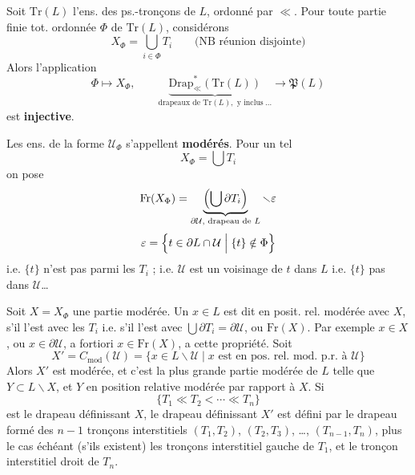 \documentclass[11pt,a4paper]{article}
\begin{document}
Soit $\mathrm{Tr}(L)$ l'ens.  des ps.-tronçons de $L$, ordonné par $\ll$. Pour toute partie finie tot. ordonnée $\Phi$ de $\mathrm{Tr}(L)$, considérons
\[
  X_{\Phi} = \bigcup_{i \in \Phi} T_i \qquad \text{(NB réunion disjointe)}
\]
Alors l'application
\[
  \Phi \longmapsto X_{\Phi}, \qquad \underbrace{\mathrm{Drap}^{*}_{\ll}(\mathrm{Tr}(L))}_{\text{drapeaux de } \mathrm{Tr}(L), \text{ y inclus}\ \ldots} \longrightarrow \mathfrak{P}(L)
\]
est \textbf{injective}.

Les ens. de la forme $\mathcal{U}_{\Phi}$ s'appellent \textbf{modérés}. Pour un tel
\[
  X_{\Phi} = \bigcup T_i
\]
on pose
\[
  \mathrm{Fr}(X_{\Phi}) = \underbrace{\Bigl( \bigcup \partial T_i \Bigr)}_{\partial \mathcal{U}, \text{ drapeau de } L} \smallsetminus \varepsilon
\]
\[
  \varepsilon = \Bigl\{ t \in \partial L \cap \mathcal{U} \;\Big|\; \{t\} \notin \Phi \Bigr\}
\]
i.e. $\{t\}$ n'est pas parmi les $T_i$ ; i.e. $\mathcal{U}$ est un voisinage de $t$ dans $L$ i.e. $\{t\}$ pas  dans $\mathcal{U}$…

 Soit $X = X_{\Phi}$ une partie modérée. Un $x \in L$ est dit en posit. rel. modérée avec $X$, s'il l'est avec les $T_i$  i.e. s'il l'est avec $\bigcup \partial T_i = \partial \mathcal{U}$, ou  $\mathrm{Fr}(X)$. Par exemple  $x \in X$, ou $x \in \partial \mathcal{U}$, a fortiori $x \in \mathrm{Fr}(X)$, a cette propriété. Soit
\[
  X' = C_{\mathrm{mod}}(\mathcal{U}) = \bigl\{ x \in L \smallsetminus \mathcal{U} \;\big|\; x \text{ est en pos. rel. mod. p.r. à } \mathcal{U} \bigr\}
\]
Alors  $X'$ est modérée, et c'est la plus grande partie modérée  de $L$ telle que  $Y \subset L \smallsetminus X$, et $Y$ en position relative modérée par rapport à $X$. Si
\[
  \{ T_1 \ll T_2 < \cdots \ll T_n \}
\]
est le drapeau définissant $X$, le drapeau définissant $X'$ est défini par le drapeau formé des $n-1$ tronçons interstitiels   $(T_1, T_2)$, $(T_2, T_3)$, …, $(T_{n-1}, T_n)$, plus le cas échéant (s'ils existent) les tronçons interstitiel gauche de $T_1$, et le tronçon interstitiel droit de $T_n$.
\end{document}
